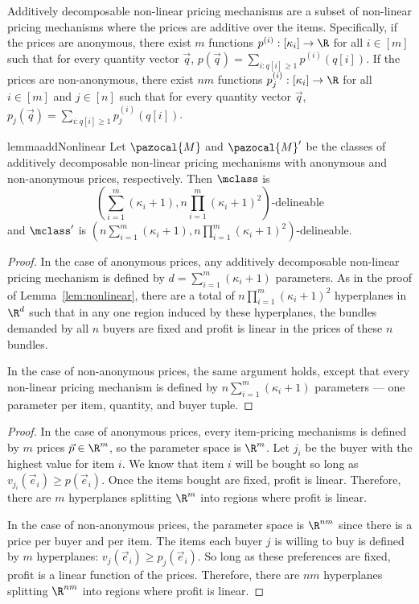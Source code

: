 \begin{definition} Additively decomposable non-linear pricing mechanisms are a subset of non-linear pricing mechanisms where the prices are additive over the items. Specifically, if the prices are anonymous, there exist $m$ functions $p^{(i)}:[\kappa_i] \to \R$ for all $i \in [m]$ such that for every quantity vector $\vec{q}$, $p(\vec{q}) = \sum_{i: q[i] \geq 1} p^{(i)}(q[i])$. If the prices are non-anonymous, there exist $nm$ functions $p^{(i)}_j:[\kappa_i] \to \R$ for all $i \in [m]$ and $j \in [n]$ such that for every quantity vector $\vec{q}$, $p_j(\vec{q}) = \sum_{i: q[i] \geq 1} p^{(i)}_j(q[i])$.\end{definition}
\begin{restatable}{lemma}{addNonlinear}\label{lem:nonlinear_additive}
Let $\pazocal{M}$ and $\pazocal{M}'$ be the classes of additively decomposable non-linear pricing mechanisms with anonymous and non-anonymous prices, respectively. Then
$\mclass$ is \[\left(\sum_{i = 1}^m (\kappa_i+1), n\prod_{i = 1}^m \left(\kappa_i+1\right)^2\right)\text{-delineable}\] and $\mclass'$ is $\left(n\sum_{i = 1}^m \left(\kappa_i+1\right), n\prod_{i = 1}^m \left(\kappa_i+1\right)^2\right)$-delineable.
\end{restatable}

\begin{proof}
In the case of anonymous prices, any additively decomposable non-linear pricing mechanism is defined by $d = \sum_{i = 1}^m (\kappa_i+1)$ parameters. As in the proof of Lemma~\ref{lem:nonlinear}, there are a total of $n\prod_{i = 1}^m (\kappa_i+1)^2$ hyperplanes in $\R^{d}$ such that in any one region induced by these hyperplanes, the bundles demanded by all $n$ buyers are fixed and profit is linear in the prices of these $n$ bundles.

In the case of non-anonymous prices, the same argument holds, except that every non-linear pricing mechanism is defined by $n\sum_{i = 1}^m (\kappa_i+1)$ parameters --- one parameter per item, quantity, and buyer tuple.
\end{proof}

\itemAdd*

\begin{proof}
In the case of anonymous prices, every item-pricing mechanisms is defined by $m$ prices $\vec{p} \in \R^m$, so the parameter space is $\R^m$. Let $j_i$ be the buyer with the highest value for item $i$. We know that item $i$ will be bought so long as $v_{j_i}(\vec{e}_i) \geq p(\vec{e}_i)$. Once the items bought are fixed, profit is linear. Therefore, there are $m$ hyperplanes splitting $\R^m$ into regions where profit is linear.

In the case of non-anonymous prices, the parameter space is $\R^{nm}$ since there is a price per buyer and per item. The items each buyer $j$ is willing to buy is defined by $m$ hyperplanes: $v_j(\vec{e}_i) \geq p_j(\vec{e}_i)$. So long as these preferences are fixed, profit is a linear function of the prices. Therefore, there are $nm$ hyperplanes splitting $\R^{nm}$ into regions where profit is linear.
\end{proof}


